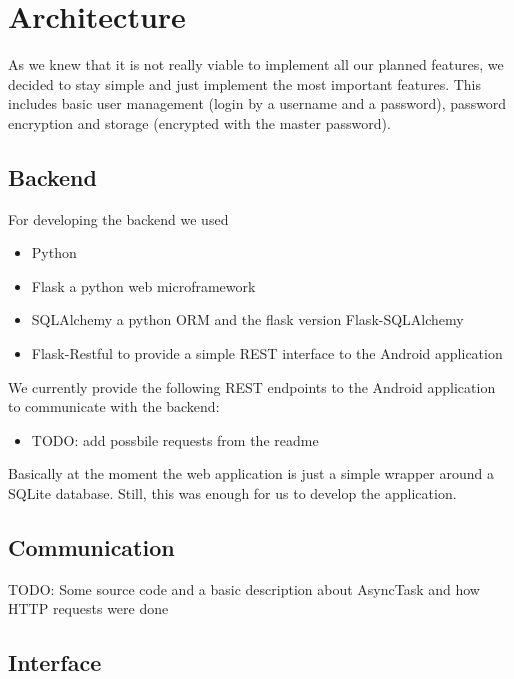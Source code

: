 \documentclass{report}
\begin{document}
\section{Architecture}

As we knew that it is not really viable to implement all our planned features, we decided to stay simple and just implement the most important features. This includes basic user management (login by a username and a password), password encryption and storage (encrypted with the master password).

\subsection{Backend}
For developing the backend we used
\begin{itemize}
	\item Python \cite{Python}
	\item Flask \cite{Flask} a python web microframework
	\item SQLAlchemy \cite{SQLAlchemy} a python ORM and the flask version Flask-SQLAlchemy \cite{FlaskSQLAlchemy}
	\item Flask-Restful \cite{Flask-Restful} to provide a simple REST interface to the Android application
\end{itemize}

We currently provide the following REST endpoints to the Android application to communicate with the backend:

\begin{itemize}
	\item TODO: add possbile requests from the readme
\end{itemize}

Basically at the moment the web application is just a simple wrapper around a SQLite database. Still, this was enough for us to develop the application.

\subsection{Communication}

TODO: Some source code and a basic description about AsyncTask and how HTTP requests were done

\subsection{Interface}
\end{document}

